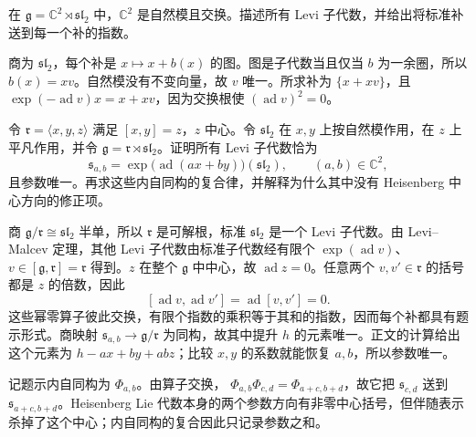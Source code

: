 \begin{optionalexercise}\label{b5:ex:20-abelian-radical-complements}
	在 \(\mathfrak g=\mathbb C^2\rtimes\mathfrak{sl}_2\) 中，\(\mathbb C^2\) 是自然模且交换。描述所有 Levi 子代数，并给出将标准补送到每一个补的指数。
\end{optionalexercise}
\begin{solution}
	商为 \(\mathfrak{sl}_2\)，每个补是 \(x\mapsto x+b(x)\) 的图。图是子代数当且仅当 \(b\) 为一余圈，所以 \(b(x)=xv\)。自然模没有不变向量，故 \(v\) 唯一。所求补为 \(\{x+xv\}\)，且 \(\exp(-\operatorname{ad}v)x=x+xv\)，因为交换根使 \((\operatorname{ad}v)^2=0\)。
\end{solution}

\begin{optionalexercise}\label{b5:ex:20-heisenberg-levi-conjugacy}
	令 \(\mathfrak r=\langle x,y,z\rangle\) 满足 \([x,y]=z\)，\(z\) 中心。令 \(\mathfrak{sl}_2\) 在 \(x,y\) 上按自然模作用，在 \(z\) 上平凡作用，并令 \(\mathfrak g=\mathfrak r\rtimes\mathfrak{sl}_2\)。证明所有 Levi 子代数恰为
	\[
		\mathfrak s_{a,b} =\exp\bigl(\operatorname{ad}(ax+by)\bigr)(\mathfrak{sl}_2), \qquad (a,b)\in\mathbb C^2,
	\]
	且参数唯一。再求这些内自同构的复合律，并解释为什么其中没有 Heisenberg 中心方向的修正项。
\end{optionalexercise}
\begin{solution}
	商 \(\mathfrak g/\mathfrak r\cong\mathfrak{sl}_2\) 半单，所以 \(\mathfrak r\) 是可解根，标准 \(\mathfrak{sl}_2\) 是一个 Levi 子代数。由 Levi--Malcev 定理，其他 Levi 子代数由标准子代数经有限个 \(\exp(\operatorname{ad}v)\)、\(v\in[\mathfrak g,\mathfrak r]=\mathfrak r\) 得到。\(z\) 在整个 \(\mathfrak g\) 中中心，故 \(\operatorname{ad}z=0\)。任意两个 \(v,v'\in\mathfrak r\) 的括号都是 \(z\) 的倍数，因此
	\[
		[\operatorname{ad}v,\operatorname{ad}v'] =\operatorname{ad}[v,v']=0.
	\]
	这些幂零算子彼此交换，有限个指数的乘积等于其和的指数，因而每个补都具有题示形式。商映射 \(\mathfrak s_{a,b}\to\mathfrak g/\mathfrak r\) 为同构，故其中提升 \(h\) 的元素唯一。正文的计算给出这个元素为 \(h-ax+by+abz\)；比较 \(x,y\) 的系数就能恢复 \(a,b\)，所以参数唯一。

	记题示内自同构为 \(\Phi_{a,b}\)。由算子交换， \(\Phi_{a,b}\Phi_{c,d}=\Phi_{a+c,b+d}\)，故它把 \(\mathfrak s_{c,d}\) 送到 \(\mathfrak s_{a+c,b+d}\)。Heisenberg Lie 代数本身的两个参数方向有非零中心括号，但伴随表示杀掉了这个中心；内自同构的复合因此只记录参数之和。
\end{solution}

